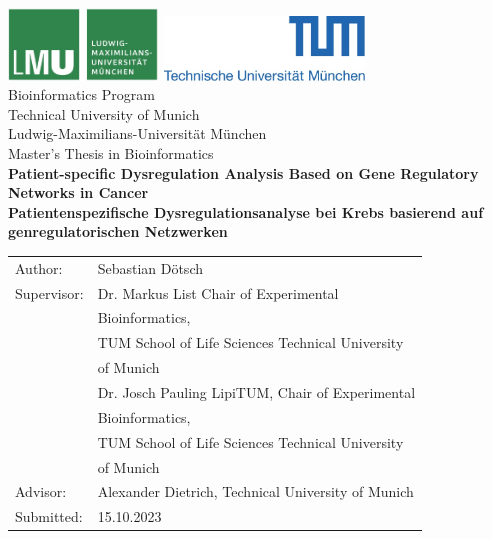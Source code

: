 \documentclass[pdftex,12pt,a4paper]{report}
\begin{document}
\begin{titlepage}
{\sffamily


\begin{center}
\includegraphics[width=0.3\textwidth]{bilder/logo2.jpg}
\hfill
\includegraphics[width=0.4\textwidth]{bilder/logo1.jpg}  
\\[3cm]  

{\Large Bioinformatics Program}\\[0.5cm]
{\Large Technical University of Munich}\\[0.5cm]
{\Large Ludwig-Maximilians-Universit\"at M\"unchen}\\[2cm]
{\Large Master's Thesis in Bioinformatics}\\[2cm]
{\textbf{\LARGE Patient-specific Dysregulation Analysis Based on Gene Regulatory Networks in Cancer}}\\[2cm]
{\textbf{\LARGE Patientenspezifische Dysregulationsanalyse bei Krebs basierend auf genregulatorischen Netzwerken}}\\[3cm]

\end{center}
\begin{center}\Large
  \begin{tabular}{ll}
    Author:& Sebastian Dötsch\\
    Supervisor: &  Dr. Markus List Chair of Experimental \\
    & Bioinformatics,\\
    & TUM School of Life Sciences Technical University\\
    & of Munich \\
    & Dr. Josch Pauling LipiTUM, Chair of Experimental \\
    & Bioinformatics, \\
    & TUM School of Life Sciences Technical University\\
    & of Munich \\
    Advisor:        &  Alexander Dietrich, Technical University of Munich\\
    Submitted:     &  15.10.2023
  \end{tabular}
\end{center}

}%

\end{titlepage}
\end{document}
